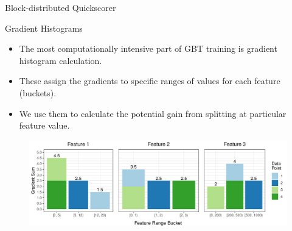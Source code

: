 \documentclass[final]{beamer}
\newlength{\onecolwid}
\begin{document}
\begin{frame}[t]
\begin{columns}[t]
\begin{column}{\onecolwid}
\begin{block}{Block-distributed Quickscorer}
\begin{figure}
			\label{fig:grad-row-dist}
		\end{figure}
		
	\end{block}
	
	\begin{block}{Gradient Histograms}
		
		\begin{itemize}
			\item The most computationally intensive part of GBT training is gradient
			histogram calculation.
			
			\item These assign the gradients to specific ranges of values for each
			feature (buckets).
			
			\item We use them to calculate the potential gain from splitting at particular
			feature value.
		\end{itemize}
		
		\begin{figure}
			\includegraphics[width=\onecolwid]{all-features-grad}
			\label{fig:grad-features}
		\end{figure}
		
	\end{block}


\end{column}
\end{columns}
\end{frame}
\end{document}
